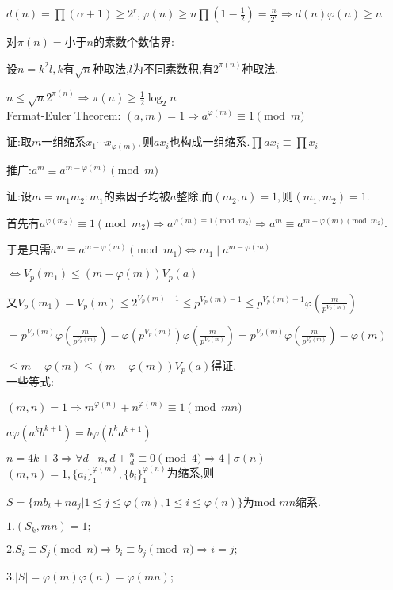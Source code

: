 $ d(n)=\prod{(\alpha+1)}\ge 2^r,\varphi(n)\ge n \prod{(1-\frac{1}{2})}=\frac{n}{2^r}\Rightarrow d(n)\varphi(n)\ge n$

对$ \pi(n)=$小于$ n$的素数个数估界: 

设$ n=k^2l,k$有$ \sqrt{n}$种取法,$ l$为不同素数积,有$ 2^{\pi(n)}$种取法.

$ n\le \sqrt{n}2^{\pi(n)}\Rightarrow \pi(n)\ge \frac{1}{2}\log_2n$
\\

Fermat-Euler Theorem:
$ (a,m)=1\Rightarrow a^{\varphi(m)}\equiv 1 \pmod m$

证:取$ m$一组缩系$ x_1\cdots x_{\varphi(m)},$则$ ax_i$也构成一组缩系.$ \prod{ax_i}\equiv \prod{x_i}$

推广:$ a^m \equiv a^{m-\varphi(m)} \pmod m$

证:设$ m=m_1m_2:m_1$的素因子均被$ a$整除,而$ (m_2,a)=1,$则$ (m_1,m_2)=1$.

首先有$ a^{\varphi(m_2)}\equiv 1 \pmod{m_2}\Rightarrow a^{\varphi(m)\equiv 1 \pmod{m_2}}\Rightarrow a^m\equiv a^{m-\varphi(m)\pmod{m_2}}$.

于是只需$ a^m\equiv a^{m-\varphi(m)}\pmod{m_1}\Leftrightarrow m_1\mid a^{m-\varphi(m)}$ 

$\Leftrightarrow V_p(m_1)\le (m-\varphi(m))V_p(a)$

又$ V_p(m_1)=V_p(m)\le2^{V_p(m)-1}\le p^{V_p(m)-1}\le p^{V_p(m)-1}\varphi(\frac{m}{p^{V_p(m)}})$ 

$=p^{V_p(m)}\varphi(\frac{m}{p^{V_p(m)}})-\varphi(p^{V_p(m)})\varphi(\frac{m}{p^{V_p(m)}})=p^{V_p(m)}\varphi(\frac{m}{p^{V_p(m)}})-\varphi(m)$ 

$\le m-\varphi(m)\le (m-\varphi(m))V_p(a)$得证.
\\

一些等式:

$ (m,n)=1\Rightarrow m^{\varphi(n)}+n^{\varphi(m)}\equiv 1 \pmod{mn}$

$ a\varphi(a^kb^{k+1})=b\varphi(b^ka^{k+1})$

$n=4k+3 \Rightarrow \forall d \mid n ,d+\frac{n}{d}\equiv 0 \pmod 4\Rightarrow 4 \mid \sigma(n)$
\\

$ (m,n)=1,\{ a_i\}_{1}^{\varphi(m)},\{ b_i\}_1^{\varphi(n)}$为缩系,则

$ S=\{ mb_i+na_j | 1\le j\le \varphi(m),1\le i \le \varphi(n)\}$为mod $ mn$缩系.

$ 1.(S_k,mn)=1; $ 

$ 2.S_i\equiv S_j \pmod n\Rightarrow b_i\equiv b_j \pmod n\Rightarrow i=j;$ 

$ 3.|S|=\varphi(m)\varphi(n)=\varphi(mn)$;
